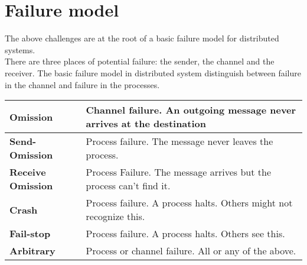 \section{Failure model}

The above challenges are at the root of a basic failure model for distributed systems. \\

There are three places of potential failure: the sender, the channel and the receiver. 
The basic failure model in distributed system distinguish between failure in the channel and failure in the processes.

 \label{tab:title}
\begin{tabular}{L{1.0in} L{3.45in} }    %
\toprule[1.5pt] %

\textbf{Omission} & Channel failure. An outgoing message never arrives at the destination \\\midrule
 
\textbf{Send-Omission} & Process failure. The message never leaves the process.\\\midrule
 
\textbf{Receive Omission} & Process Failure. The message arrives but the process can't find it.\\\midrule
 
\textbf{Crash} & Process failure. A process halts. Others might not recognize this.\\\midrule
 
\textbf{Fail-stop} & Process failure. A process halts. Others see this.\\\midrule
 
\textbf{Arbitrary} &  Process or channel failure. All or any of the above.\\

\bottomrule[1.25pt] %
\end {tabular}\par
\bigskip
